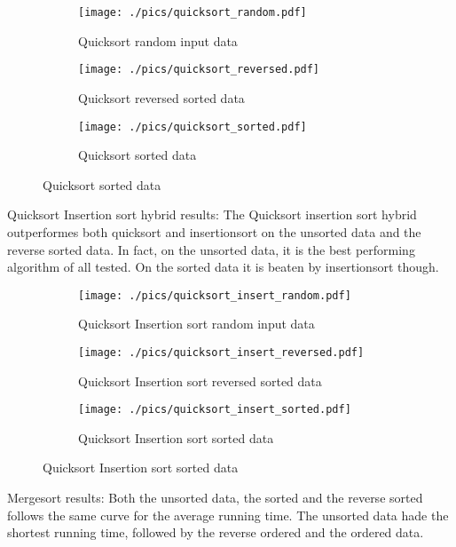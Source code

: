 \begin{figure}[H]
	\centering
	\begin{subfigure}[b]{0.5\textwidth}
		\centering
		\texttt{[image: ./pics/quicksort\_random.pdf]}
		\caption{Quicksort random input data}
	\end{subfigure}
	\hfill
	\begin{subfigure}[b]{0.5\textwidth}
		\centering
		\texttt{[image: ./pics/quicksort\_reversed.pdf]}
		\caption{Quicksort reversed sorted data}
	\end{subfigure}
	\hfill
	\begin{subfigure}[b]{0.5\textwidth}
		\centering
		\texttt{[image: ./pics/quicksort\_sorted.pdf]}
		\caption{Quicksort sorted data}
	\end{subfigure}
\end{figure}

Quicksort Insertion sort hybrid results:
The Quicksort insertion sort hybrid outperformes both quicksort and insertionsort on the unsorted data and the reverse sorted data. In fact, on the unsorted data, it is the best performing algorithm of all tested. On the sorted data it is beaten by insertionsort though.

\begin{figure}[H]
	\centering
	\begin{subfigure}[b]{0.5\textwidth}
		\centering
		\texttt{[image: ./pics/quicksort\_insert\_random.pdf]}
		\caption{Quicksort Insertion sort random input data}
	\end{subfigure}
	\hfill
	\begin{subfigure}[b]{0.5\textwidth}
		\centering
		\texttt{[image: ./pics/quicksort\_insert\_reversed.pdf]}
		\caption{Quicksort Insertion sort reversed sorted data}
	\end{subfigure}
	\hfill
	\begin{subfigure}[b]{0.5\textwidth}
		\centering
		\texttt{[image: ./pics/quicksort\_insert\_sorted.pdf]}
		\caption{Quicksort Insertion sort sorted data}
	\end{subfigure}
\end{figure}


Mergesort results:
Both the unsorted data, the sorted and the reverse sorted follows the same curve for the average running time. The unsorted data hade the shortest running time, followed by the reverse ordered and the ordered data.

